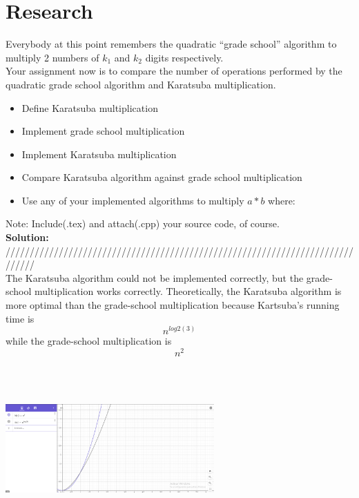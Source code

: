 \documentclass[12pt]{article}
\begin{document}
\section{Research}

Everybody at this point remembers the quadratic ``grade school'' algorithm to multiply 2 numbers of $k_{1}$ and $k_{2}$ digits respectively. \\

Your assignment now is to compare the number of operations performed by the quadratic grade school algorithm and Karatsuba multiplication.

\begin{itemize}
    \item Define Karatsuba multiplication
    \item Implement grade school multiplication
    \item Implement Karatsuba multiplication
    \item Compare Karatsuba algorithm against grade school multiplication
    \item Use any of your implemented algorithms to multiply $a*b$ where:
\end{itemize}

Note: Include(.tex) and attach(.cpp) your source code, of course.\\

\textbf{Solution:}\\

////////////////////////////////////////////////////////////////////////////// \\
The Karatsuba algorithm could not be implemented correctly, but the grade-school multiplication works correctly. Theoretically, the Karatsuba algorithm is more optimal than the grade-school multiplication because Kartsuba's running time is \begin{equation} n^{log2 (3)} \end{equation} while the grade-school multiplication is \begin{equation} n^{2} \end{equation}\\
\includegraphics[width=8cm, height=6cm]{2}
\end{document}
